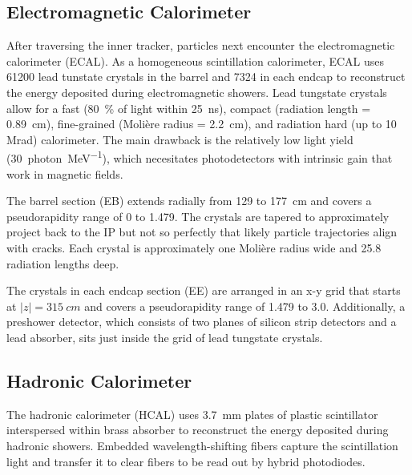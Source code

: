 \documentclass[12pt]{article}
\begin{document}
    \subsection{Electromagnetic Calorimeter}
        After traversing the inner tracker, particles next encounter the electromagnetic calorimeter (ECAL). As a homogeneous scintillation calorimeter, ECAL uses \num{61200} lead tunstate crystals in the barrel and \num{7324} in each endcap to reconstruct the energy deposited during electromagnetic showers. Lead tungstate crystals allow for a fast (\SI{80}{\percent} of light within \SI{25}{ns}), compact (radiation length = \SI{0.89}{cm}), fine-grained (Moli\`ere radius = \SI{2.2}{cm}), and radiation hard (up to 10 Mrad) calorimeter. The main drawback is the relatively low light yield (\SI{30}{photon\per\mega\electronvolt}), which necesitates photodetectors with intrinsic gain that work in magnetic fields.

        The barrel section (EB) extends radially from \num{129} to \SI{177}{cm} and covers a pseudorapidity range of \num{0} to \num{1.479}. The crystals are tapered to approximately project back to the IP but not so perfectly that likely particle trajectories align with cracks. Each crystal is approximately one Moli\`ere radius wide and 25.8 radiation lengths deep.

        The crystals in each endcap section (EE) are arranged in an x-y grid that starts at $\lvert z \rvert = \SI{315}{cm}$ and covers a pseudorapidity range of \num{1.479} to \num{3.0}. Additionally, a preshower detector, which consists of two planes of silicon strip detectors and a lead absorber, sits just inside the grid of lead tungstate crystals. 

    \subsection{Hadronic Calorimeter}
        The hadronic calorimeter (HCAL) uses \SI{3.7}{mm} plates of plastic scintillator interspersed within brass absorber to reconstruct the energy deposited during hadronic showers. Embedded wavelength-shifting fibers capture the scintillation light and transfer it to clear fibers to be read out by hybrid photodiodes.
\end{document}
